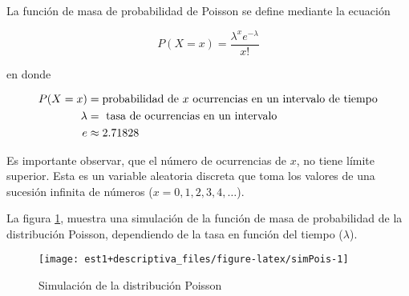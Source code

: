 \documentclass[
]{book}
\theoremstyle{definition}
\theoremstyle{definition}
\theoremstyle{definition}
\theoremstyle{definition}
\theoremstyle{remark}
\begin{document}
La función de masa de probabilidad de Poisson se define mediante la ecuación

\begin{equation}
P(X = x) = \dfrac{\lambda^xe^{-\lambda}}{x!}
\label{eq:poisson}
\end{equation}

en donde

\begin{equation}
\notag
\begin{split}
P(X = x) &= \text{probabilidad de } x \text{ ocurrencias en un intervalo de tiempo}\\
\lambda &= \text{ tasa de ocurrencias en un intervalo}\\
e &\approx 2.71828\\
\end{split}
\end{equation}

Es importante observar, que el número de ocurrencias de \(x\), no tiene límite superior. Esta es un variable aleatoria discreta que toma los valores de una sucesión infinita de números (\(x = 0,1,2,3,4,\ldots\)).

La figura \ref{fig:simPois}, muestra una simulación de la función de masa de probabilidad de la distribución Poisson, dependiendo de la tasa en función del tiempo (\(\lambda\)).

\begin{figure}

{\centering \texttt{[image: est1+descriptiva\_files/figure-latex/simPois-1]} 

}

\caption{Simulación de la distribución Poisson}\label{fig:simPois}
\end{figure}
\end{document}
